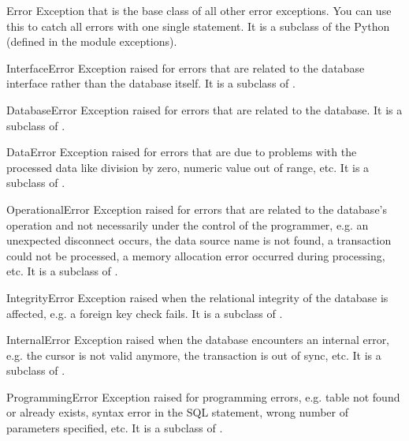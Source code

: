 \begin{excdesc}{Error}
Exception that is the base class of all other error exceptions.  You
can use this to catch all errors with one single 
statement.  It is a subclass of the Python 
(defined in the module exceptions).
\end{excdesc}

\begin{excdesc}{InterfaceError}
Exception raised for errors that are related to the database interface
rather than the database itself.  It is a subclass of .
\end{excdesc}

\begin{excdesc}{DatabaseError}
Exception raised for errors that are related to the database.  It is a
subclass of .
\end{excdesc}

\begin{excdesc}{DataError}
Exception raised for errors that are due to problems with the
processed data like division by zero, numeric value out of range,
etc.  It is a subclass of .
\end{excdesc}

\begin{excdesc}{OperationalError}
Exception raised for errors that are related to the database's
operation and not necessarily under the control of the programmer,
e.g. an unexpected disconnect occurs, the data source name is not
found, a transaction could not be processed, a memory allocation error
occurred during processing, etc.  It is a subclass of
.
\end{excdesc}

\begin{excdesc}{IntegrityError}
Exception raised when the relational integrity of the database is
affected, e.g. a foreign key check fails.  It is a subclass of
.
\end{excdesc}

\begin{excdesc}{InternalError}
Exception raised when the database encounters an internal error,
e.g. the cursor is not valid anymore, the transaction is out of sync,
etc.  It is a subclass of .
\end{excdesc}

\begin{excdesc}{ProgrammingError}
Exception raised for programming errors, e.g. table not found or
already exists, syntax error in the SQL statement, wrong number of
parameters specified, etc.  It is a subclass of .
\end{excdesc}

